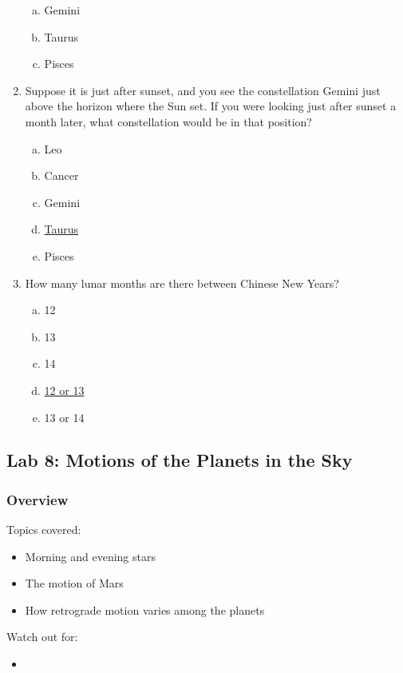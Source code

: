 \documentclass[12pt]{article}
\begin{document}
\begin{enumerate}
\begin{enumerate}[a.]
    \item Gemini
    \item Taurus
    \item Pisces
\end{enumerate}
\item%
Suppose it is just after sunset, and you see the constellation Gemini just above the horizon where the Sun set. If you were looking just after sunset a month later, what constellation would be in that position?
\begin{enumerate}[a.]
    \item Leo
    \item Cancer
    \item Gemini
    \item \underline{Taurus}
    \item Pisces
\end{enumerate}
\item
How many lunar months are there between Chinese New Years?
\begin{enumerate}[a.]
    \item 12
    \item 13
    \item 14
    \item \underline{12 or 13}
    \item 13 or 14
\end{enumerate}
\end{enumerate}


\newpage
\subsection{Lab 8: Motions of the Planets in the Sky}

\subsubsection{Overview}

Topics covered:
\begin{itemize}
\item Morning and evening stars
\item The motion of Mars
\item How retrograde motion varies among the planets
\end{itemize}

\noindent
Watch out for:
\begin{itemize}
\item 
\end{itemize}
\end{document}
